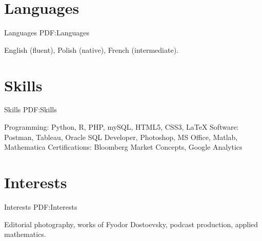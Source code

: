 \documentclass[letterpaper,10pt,oneside]{article}
\newcommand{\CVNote}{Resume compiled on {\today}}
\begin{document}
\begin{body}
\begin{comment}
\GapNoBreak
\BulletItem
Photography Editor
\begin{detail}
\SubBulletItem
Collaborated with Trinity College Student Photographers to provide photographic content for weekly paper.
\SubBulletItem
Delivered hundreds of images for a variety of different stories, including custom stock imagery.
\SubBulletItem
Developed automated system for photo captioning using EXIF data, extracted using Adobe InDesign, resulting in 75\% time decrease when formatting images.
\end{detail}
\end{comment}


\noindent\hrulefill
\section
{Languages}
{Languages}
{PDF:Languages}

English (fluent), Polish (native), French (intermediate).


\section
{Skills}
{Skills}
{PDF:Skills}

Programming: Python, R, PHP, mySQL, HTML5, CSS3, \LaTeX \hfill\break
Software: Postman, Tableau, Oracle SQL Developer, Photoshop, MS Office, Matlab, Mathematica\hfill\break
Certifications: Bloomberg Market Concepts, Google Analytics


\section
{Interests}
{Interests}
{PDF:Interests}

Editorial photography, works of Fyodor Dostoevsky, podcast production, applied mathematics.


\begin{comment}
\section
{References}
{References}
{PDF:References}

Available upon request.
\end{comment}
\end{body}


\begin{flushright}
\UseNoteFont
\hspace{2.0mm}\null
\end{flushright}
\end{document}
